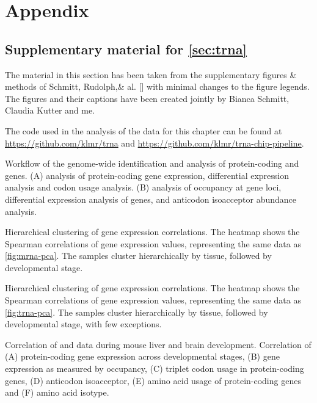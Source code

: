 \clearpage
{}
{}
\part*{Appendix}
\label{sec:appendix}

\setcounter{chapter}{0}
\renewcommand\thechapter{\Alph{chapter}}

\chapter{Supplementary material for \texorpdfstring{\cref*{sec:trna}}{chapter 2}}

The material in this section has been taken from the supplementary figures \&
methods of Schmitt, Rudolph,\andothersdelim\& al. [\cite*{Schmitt:2014}] with
minimal changes to the figure legends. The figures and their captions have been
created jointly by Bianca Schmitt, Claudia Kutter and me.

The code used in the analysis of the data for this chapter can be found at
\url{https://github.com/klmr/trna} and
\url{https://github.com/klmr/trna-chip-pipeline}.

\begingroup
\renewcommand*\floatpos{H}

    {Workflow of the genome-wide identification and analysis of protein-coding
    and \trna genes.}
    {(A) \rnaseq analysis of protein-coding gene expression, differential
    expression analysis and codon usage analysis. (B) \chipseq analysis of 
    occupancy at \trna gene loci, differential expression analysis of \trna
    genes, and anticodon isoacceptor abundance analysis.}

    {Hierarchical clustering of \mrna gene expression correlations.}
    {The heatmap shows the Spearman correlations of \mrna gene expression values,
    representing the same data as \cref{fig:mrna-pca}. The samples cluster
    hierarchically by tissue, followed by developmental stage.}

    {Hierarchical clustering of \trna gene expression correlations.}
    {The heatmap shows the Spearman correlations of \trna gene expression values,
    representing the same data as \cref{fig:trna-pca}. The samples cluster
    hierarchically by tissue, followed by developmental stage, with few
    exceptions.}

    {Correlation of \rnaseq and  \chipseq data during mouse liver and brain
    development.}
    {Correlation of (A) protein-coding gene expression across developmental
    stages, (B) \trna gene expression as measured by  occupancy, (C)
    triplet codon usage in protein-coding genes, (D) \trna anticodon
    isoacceptor, (E) amino acid usage of protein-coding genes and (F) \trna
    amino acid isotype.}


